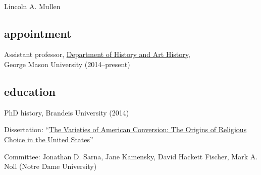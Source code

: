\documentclass[11pt]{article}
\begin{document}
\thispagestyle{fancy}
\fancyfoot{}
\fancyhead{}
\renewcommand{\headrulewidth}{0pt}

\hfill\hfill\hfill
\hfill\hfill\hfill
\hfill\hfill\hfill
\hfill\hfill\hfill
\begin{minipage}[t]{1.4in}
   \\
\end{minipage}
\hfill
\begin{minipage}[t]{1.9in}
\end{minipage}

\vspace{0.1in}

{\Large Lincoln A. Mullen}\\[-0.1in]

\subsection{appointment}\label{appointment}

Assistant professor, \href{http://historyarthistory.gmu.edu/}{Department
  of History and Art History},\\George Mason University (2014--present)

\subsection{education}\label{education}

PhD history, Brandeis University (2014)

\hfill\begin{minipage}{6.25in}

  Dissertation: ``\href{/research/\#dissertation}{The Varieties of American Conversion: The Origins of Religious Choice in the United States}''

  Committee: Jonathan D. Sarna, Jane Kamensky, David Hackett Fischer, Mark A. Noll 
  (Notre Dame University)

\end{minipage}
\end{document}
